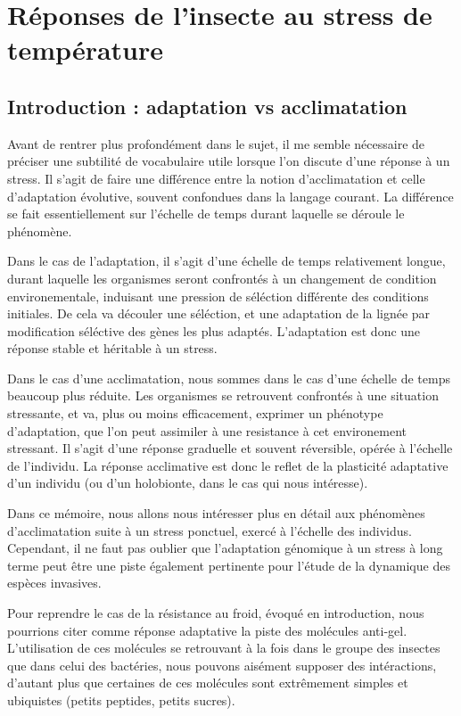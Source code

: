 \chapter{Réponses de l'insecte au stress de température} %
\label{chap:repstress}
	
	\section{Introduction : adaptation vs acclimatation} %
	\label{sec:adaptation_vs_acclimatation}

Avant de rentrer plus profondément dans le sujet, il me semble nécessaire de
préciser une subtilité de vocabulaire utile lorsque l'on discute d'une réponse
à un stress. Il s'agit de faire une différence entre la notion d'acclimatation
et celle d'adaptation évolutive, souvent confondues dans la langage courant.
La différence se fait essentiellement sur l'échelle de temps durant laquelle
se déroule le phénomène.

Dans le cas de l'adaptation, il s'agit d'une échelle de temps relativement
longue, durant laquelle les organismes seront confrontés à un changement de
condition environementale, induisant une pression de séléction différente des
conditions initiales. De cela va découler une séléction, et une adaptation de
la lignée par modification séléctive des gènes les plus adaptés. L'adaptation
est donc une réponse stable et héritable à un stress.

Dans le cas d'une acclimatation, nous sommes dans le cas d'une échelle de
temps beaucoup plus réduite. Les organismes se retrouvent confrontés à une
situation stressante, et va, plus ou moins efficacement, exprimer un phénotype
d'adaptation, que l'on peut assimiler à une resistance à cet environement
stressant. Il s'agit d'une réponse graduelle et souvent réversible, opérée à
l'échelle de l'individu. La réponse acclimative est donc le reflet de la
plasticité adaptative d'un individu (ou d'un holobionte, dans le cas qui nous
intéresse).

Dans ce mémoire, nous allons nous intéresser plus en détail aux phénomènes
d'acclimatation suite à un stress ponctuel, exercé à l'échelle des individus.
Cependant, il ne faut pas oublier que l'adaptation génomique à un stress à
long terme peut être une piste également pertinente pour l'étude de la
dynamique des espèces invasives.

Pour reprendre le cas de la résistance au froid, évoqué en introduction, nous
pourrions citer comme réponse adaptative la piste des molécules anti-gel.
L'utilisation de ces molécules se retrouvant à la fois dans le groupe des
insectes\cite{duman2001} que dans celui des bactéries\cite{xu1998}, nous
pouvons aisément supposer des intéractions, d'autant plus que certaines de ces
molécules sont extrêmement simples et ubiquistes (petits peptides, petits
sucres).


